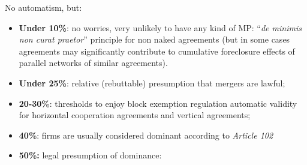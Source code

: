             No automatism, but:
                \begin{itemize}
                    \item \textbf{Under 10\%}: no worries, very unlikely to have any kind of MP: “\textit{de minimis non curat praetor}” principle for non naked agreements (but in some cases agreements may significantly contribute to cumulative foreclosure effects of parallel networks of similar agreements).
                    \item \textbf{Under 25\%}: relative (rebuttable) presumption that mergers are lawful;
                    \item \textbf{20-30\%}: thresholds to enjoy block exemption regulation automatic validity for horizontal cooperation agreements and vertical agreements;
                    \item \textbf{40\%}: firms are usually considered dominant according to \textit{Article 102}
                    \item \textbf{50\%:} legal presumption of dominance:
                        
                \end{itemize}